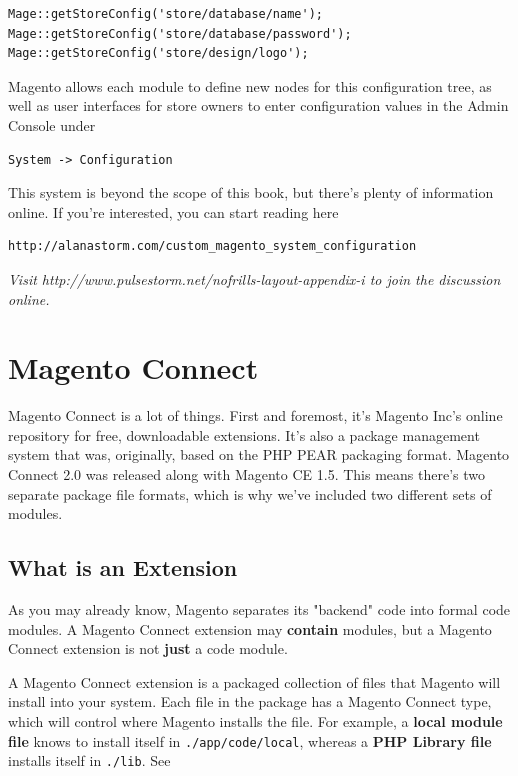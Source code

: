 \documentclass[oneside]{book}
\begin{document}
\begin{lstlisting}
Mage::getStoreConfig('store/database/name');
Mage::getStoreConfig('store/database/password');
Mage::getStoreConfig('store/design/logo');

\end{lstlisting}


Magento allows each module to define new nodes for this configuration tree, as well as user interfaces for store owners to enter configuration values in the Admin Console under

\begin{lstlisting}
System -> Configuration

\end{lstlisting}


This system is beyond the scope of this book, but there's plenty of information online.  If you're interested, you can start reading here

\begin{lstlisting}
http://alanastorm.com/custom_magento_system_configuration

\end{lstlisting}


\emph{Visit http://www.pulsestorm.net/nofrills-layout-appendix-i to join the discussion online.}
\chapter{Magento Connect}
Magento Connect is a lot of things.  First and foremost, it's Magento Inc's online repository for free, downloadable extensions.  It's also a package management system that was, originally, based on the PHP PEAR packaging format.  Magento Connect 2.0 was released along with Magento CE 1.5.  This means there's two separate package file formats, which is why we've included two different sets of modules.

\section{What is an Extension}

As you may already know, Magento separates its "backend" code into formal code modules. A Magento Connect extension may \textbf{contain} modules, but a Magento Connect extension is not \textbf{just} a code module.

A Magento Connect extension is a packaged collection of files that Magento will install into your system.  Each file in the package has a Magento Connect type, which will control where Magento installs the file.  For example, a \textbf{local module file} knows to install itself in \footnotesize\texttt{./app/code/local}\normalsize, whereas a \textbf{PHP Library file} installs itself in \footnotesize\texttt{./lib}\normalsize.  See
\end{document}
